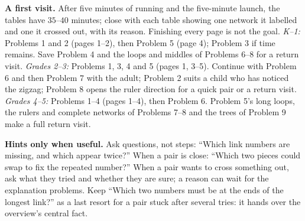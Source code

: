\documentclass[11pt]{article}
\begin{document}
\begin{minipage}{\linewidth}
\begin{center}
\end{center}
\end{minipage}

\textbf{A first visit.} After five minutes of running and the five-minute launch, the tables have $35$--$40$ minutes; close with each table showing one network it labelled and one it crossed out, with its reason. Finishing every page is not the goal. \emph{K--1:} Problems 1 and 2 (pages 1--2), then Problem 5 (page 4); Problem 3 if time remains. Save Problem 4 and the loops and middles of Problems 6--8 for a return visit. \emph{Grades 2--3:} Problems 1, 3, 4 and 5 (pages 1, 3--5). Continue with Problem 6 and then Problem 7 with the adult; Problem 2 suits a child who has noticed the zigzag; Problem 8 opens the ruler direction for a quick pair or a return visit. \emph{Grades 4--5:} Problems 1--4 (pages 1--4), then Problem 6. Problem 5's long loops, the rulers and complete networks of Problems 7--8 and the trees of Problem 9 make a full return visit.

\textbf{Hints only when useful.} Ask questions, not steps: ``Which link numbers are missing, and which appear twice?'' When a pair is close: ``Which two pieces could swap to fix the repeated number?'' When a pair wants to cross something out, ask what they tried and whether they are sure; a reason can wait for the explanation problems. Keep ``Which two numbers must be at the ends of the longest link?'' as a last resort for a pair stuck after several tries: it hands over the overview's central fact.


\end{document}
